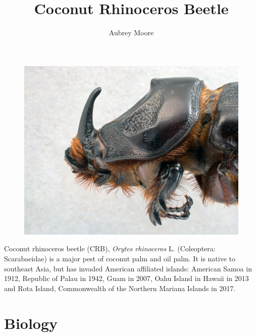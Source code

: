 \documentclass[twocolumn,letterpaper]{scrartcl}
\begin{document}
	
\title{Coconut Rhinoceros Beetle}
\author{Aubrey Moore}
\maketitle


\newpage


\begin{figure}[h]
	\centering
	\includegraphics[width=\linewidth]{images/rhino_beetle_head}
	\label{fig:rhinobeetlehead}
\end{figure}

Coconut rhinoceros beetle (CRB), \textit{Orytes rhinoceros} L. (Coleoptera: Scarabaeidae) is a major pest of coconut palm and oil palm. It is native to southeast Asia, but has invaded American affiliated islands: American Samoa in 1912, Republic of Palau in 1942, Guam in 2007, Oahu Island in Hawaii in 2013 and Rota Island, Commonwealth of the Northern Mariana Islands in 2017.

\section{Biology}
\end{document}
